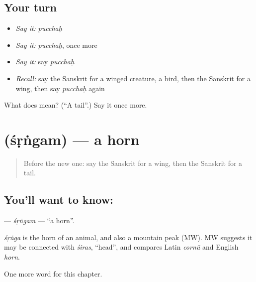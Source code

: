 \subsection*{Your turn}
\begin{itemize}
\raggedright
  \item \emph{Say it:} \emph{pucchaḥ}
  \item \emph{Say it:} \emph{pucchaḥ}, once more
  \item \emph{Say it:} say \emph{pucchaḥ}
  \item \emph{Recall:} say the Sanskrit for a winged creature, a bird, then the Sanskrit for a wing, then say \emph{pucchaḥ} again
\end{itemize}

\begin{tcolorbox}[breakable,colback=teal!4,colframe=teal!35!black,title={Before you move on}]
What does  mean? (\textquotedblleft{}A tail\textquotedblright{}.) Say it once more.
\end{tcolorbox}
\section[\texorpdfstring{\sk{शृंगम्} (śṛṅgam)}{शृंगम् (śṛṅgam)}]{ (śṛṅgam) — a horn}

\label{lesson:SA-C227-srngam}



\begin{quote}
Before the new one: say the Sanskrit for a wing, then the Sanskrit for a tail.
\end{quote}

\subsection*{You'll want to know: }
\textbf{} — \emph{śṛṅgam} — \textquotedblleft{}a horn\textquotedblright{}.

\begin{cousinweb}
\emph{śṛṅga} is the horn of an animal, and also a mountain peak (MW). MW suggests it may be connected with \emph{śiras}, \textquotedblleft{}head\textquotedblright{}, and compares Latin \emph{cornū} and English \emph{horn}.
\end{cousinweb}

\begin{grammarlens}[title={What you've built}]
One more word for this chapter.
\end{grammarlens}

